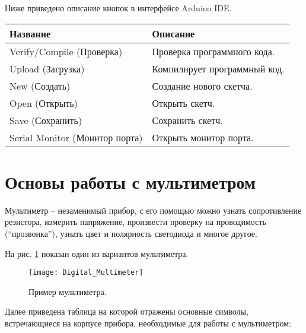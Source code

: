 \documentclass[../main.tex]{subfiles}
\begin{document}
Ниже приведено описание кнопок в интерфейсе Arduino IDE.


\begin{tabular}{p{4cm}|p{6cm}}
  Название & Описание \\
  \hline \hline
  Verify/Compile (Проверка) & Проверка программного кода. \\
  \hline
  Upload (Загрузка) & Компилирует программный код.\\
  \hline
  New (Создать) & Создание нового скетча.\\
  \hline
  Open (Открыть) & Открыть скетч.\\
  \hline
  Save (Сохранить) & Сохранить скетч.\\
  \hline
  Serial Monitor (Монитор порта) & Открыть монитор порта.\\
\end{tabular}

\section{Основы работы с мультиметром}
Мультиметр -- незаменимый прибор, с его помощью можно узнать сопротивление
резистора, измерить напряжение, произвести проверку на проводимость
(``прозвонка''), узнать цвет и полярность светодиода и многое другое.

На рис. \ref{fig:multimeter-example} показан один из вариантов мультиметра.

\begin{figure}[ht]
  \centering
  \caption{Пример мультиметра.}
  \texttt{[image: Digital\_Multimeter]}
  \label{fig:multimeter-example}
\end{figure}

Далее приведена таблица на которой отражены основные символы, встречающиеся на
корпусе прибора, необходимые для работы с мультиметром:
\end{document}
